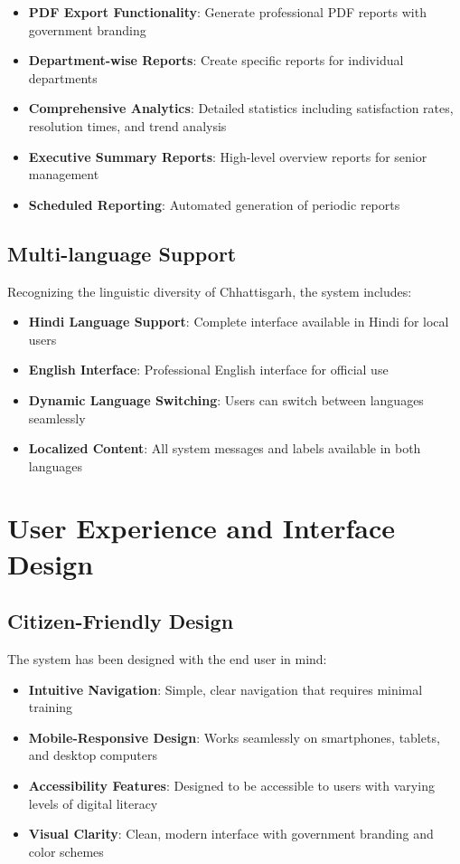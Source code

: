 \documentclass[12pt,a4paper]{article}
\begin{document}
\begin{itemize}[leftmargin=2em]
    \item \textbf{PDF Export Functionality}: Generate professional PDF reports with government branding
    \item \textbf{Department-wise Reports}: Create specific reports for individual departments
    \item \textbf{Comprehensive Analytics}: Detailed statistics including satisfaction rates, resolution times, and trend analysis
    \item \textbf{Executive Summary Reports}: High-level overview reports for senior management
    \item \textbf{Scheduled Reporting}: Automated generation of periodic reports
\end{itemize}

\subsection{Multi-language Support}

Recognizing the linguistic diversity of Chhattisgarh, the system includes:

\begin{itemize}[leftmargin=2em]
    \item \textbf{Hindi Language Support}: Complete interface available in Hindi for local users
    \item \textbf{English Interface}: Professional English interface for official use
    \item \textbf{Dynamic Language Switching}: Users can switch between languages seamlessly
    \item \textbf{Localized Content}: All system messages and labels available in both languages
\end{itemize}

\section{User Experience and Interface Design}

\subsection{Citizen-Friendly Design}

The system has been designed with the end user in mind:

\begin{itemize}[leftmargin=2em]
    \item \textbf{Intuitive Navigation}: Simple, clear navigation that requires minimal training
    \item \textbf{Mobile-Responsive Design}: Works seamlessly on smartphones, tablets, and desktop computers
    \item \textbf{Accessibility Features}: Designed to be accessible to users with varying levels of digital literacy
    \item \textbf{Visual Clarity}: Clean, modern interface with government branding and color schemes
\end{itemize}
\end{document}
